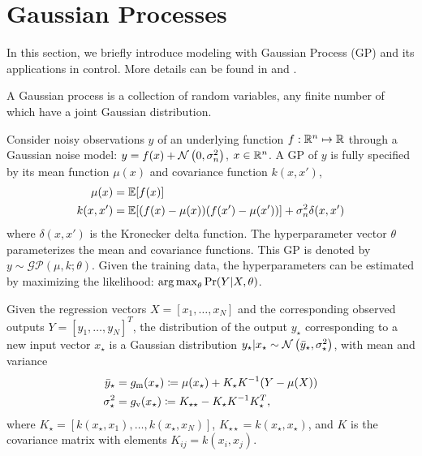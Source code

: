 \section{Gaussian Processes}
\label{S:gp}

In this section, we briefly introduce modeling with Gaussian Process (GP) and its applications in control.
More details can be found in \cite{Rasmussen2006} %
and \cite{Kocijan2016}. %

\begin{definition}
 A Gaussian process is a collection of random variables, any finite number of which have a joint Gaussian distribution.
\end{definition}
Consider noisy observations \(y\) of an underlying function \(f: \mathbb{R}^n \mapsto \mathbb{R}\) through a Gaussian noise model: \(y = f(x) + \operatorname*{\mathcal{N}}\left(0, \sigma_n^2\right)\), \(x \in \mathbb{R}^n\).
A GP of \(y\) is fully specified by its mean function \(\mu(x)\) and covariance function \(k(x,x')\),
\begin{align*}
\mu(x) &= \mathbb{E} [f(x)] \\
k(x,x') &= \mathbb{E} [(f(x)-\mu(x)) (f(x') - \mu(x'))] + \sigma_n^2 \delta(x,x')
\end{align*}
where \(\delta(x,x')\) is the Kronecker delta function.
The hyperparameter vector \(\theta\) parameterizes the mean and covariance functions.
This GP is denoted by \(y \sim \mathcal{GP}(\mu, k; \theta)\).
Given the training data, the hyperparameters can be estimated by maximizing the likelihood: \(\operatorname*{arg\,max}_\theta \Pr(Y \vert X, \theta)\).

Given the regression vectors \(X = [x_1, \dots, x_N]\) and the corresponding observed outputs \(Y = [y_1, \dots, y_N]^T\), the distribution of the output \(y_\star\) corresponding to a new input vector \(x_\star\) is a Gaussian distribution \(y_\star | x_\star \sim \operatorname*{\mathcal{N}}\left(\bar{y}_\star, \sigma_\star^2\right)\), with mean and variance
\begin{subequations}
\label{E:gp-regression}
\begin{align}
\bar{y}_\star &= g_{\mathrm{m}} (x_{\star}) \coloneqq \mu(x_\star) + K_\star K^{-1} (Y - \mu(X))\\
\sigma_\star^2 &= g_{\mathrm{v}} (x_{\star}) \coloneqq K_{\star \star} - K_\star K^{-1} K_\star^T \text,
\end{align}
\end{subequations}
where \(K_\star = [k(x_\star, x_1), \dots, k(x_\star, x_N)]\), \(K_{\star \star} = k(x_\star, x_\star)\), and $K$ is the covariance matrix with elements \(K_{ij} = k(x_i, x_j)\).

